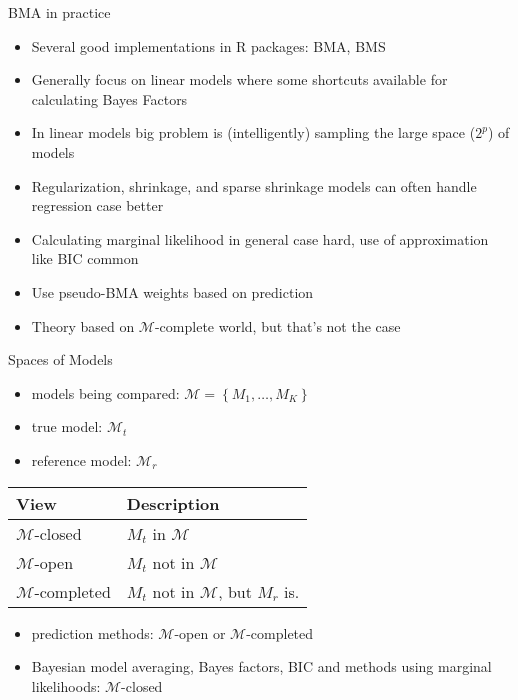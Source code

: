 \documentclass[ignorenonframetext,]{beamer}
\providecommand{\tightlist}{%
  \setlength{\itemsep}{0pt}\setlength{\parskip}{0pt}}
\begin{document}
\begin{frame}{BMA in practice}
\protect\hypertarget{bma-in-practice}{}

\begin{itemize}
\tightlist
\item
  Several good implementations in R packages: BMA, BMS
\item
  Generally focus on linear models where some shortcuts available for
  calculating Bayes Factors
\item
  In linear models big problem is (intelligently) sampling the large
  space (\(2^p\)) of models
\item
  Regularization, shrinkage, and sparse shrinkage models can often
  handle regression case better
\item
  Calculating marginal likelihood in general case hard, use of
  approximation like BIC common
\item
  Use pseudo-BMA weights based on prediction
\item
  Theory based on \(\mathcal{M}\)-complete world, but that’s not the
  case
\end{itemize}

\end{frame}

\begin{frame}{Spaces of Models}
\protect\hypertarget{spaces-of-models}{}

\begin{itemize}
\tightlist
\item
  models being compared:
  \(\mathcal{M} = \left\{M_1, \dots, M_K \right\}\)
\item
  true model: \(\mathcal{M}_t\)
\item
  reference model: \(\mathcal{M}_r\)
\end{itemize}

\begin{longtable}[]{@{}ll@{}}
\toprule
View & Description\tabularnewline
\midrule
\endhead
\(\mathcal{M}\)-closed & \(M_t\) in \(\mathcal{M}\)\tabularnewline
\(\mathcal{M}\)-open & \(M_t\) not in \(\mathcal{M}\)\tabularnewline
\(\mathcal{M}\)-completed & \(M_t\) not in \(\mathcal{M}\), but \(M_r\)
is.\tabularnewline
\bottomrule
\end{longtable}

\begin{itemize}
\tightlist
\item
  prediction methods: \(\mathcal{M}\)-open or \(\mathcal{M}\)-completed
\item
  Bayesian model averaging, Bayes factors, BIC and methods using
  marginal likelihoods: \(\mathcal{M}\)-closed
\end{itemize}

\end{frame}
\end{document}
